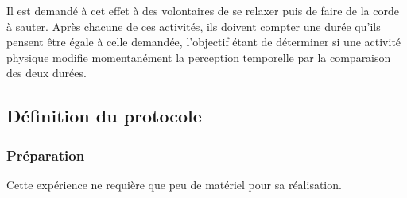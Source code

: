 \documentclass[12pt,fleqn,oneside,french,openany]{book} %
\begin{document}
Il est demandé à cet effet à des volontaires de se relaxer puis de faire de la corde à sauter. Après chacune de ces activités, ils doivent compter une durée qu'ils pensent être égale à celle demandée, l'objectif étant de déterminer si une activité physique modifie momentanément la perception temporelle par la comparaison des deux durées.

\subsection{Définition du protocole} \label{ssec:defProto2.1}

\subsubsection{Préparation} \label{sssec:preparation2.1}
Cette expérience ne requière que peu de matériel pour sa réalisation.
\end{document}
